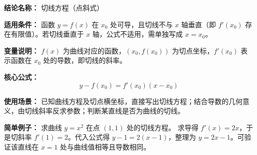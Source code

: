 \textbf{结论名称：} 切线方程（点斜式）

\textbf{适用条件：} 函数 \(y=f(x)\) 在 \(x_0\) 处可导，且切线不与 \(x\) 轴垂直（即 \(f'(x_0)\) 存在有限值）。若切线垂直于 \(x\) 轴，公式不适用，需单独写成 \(x=x_0\)。

\textbf{变量说明：} \(f(x)\) 为曲线对应的函数，\((x_0, f(x_0))\) 为切点坐标，\(f'(x_0)\) 表示函数在 \(x_0\) 处的导数，即切线的斜率。

\textbf{核心公式：}
\[
\boxed{y - f(x_0) = f'(x_0)(x - x_0)}
\]

\textbf{使用场景：} 已知曲线方程及切点横坐标，直接写出切线方程；结合导数的几何意义，由切线斜率反求参数；判断某直线是否为曲线的切线。

\textbf{简单例子：} 求曲线 \(y = x^2\) 在点 \((1,1)\) 处的切线方程。  
求导得 \(f'(x) = 2x\)，于是切斜率 \(f'(1) = 2\)。代入公式得 \(y - 1 = 2(x - 1)\)，整理为 \(y = 2x - 1\)。可验证该直线在 \(x=1\) 处与曲线值相等且导数相同。